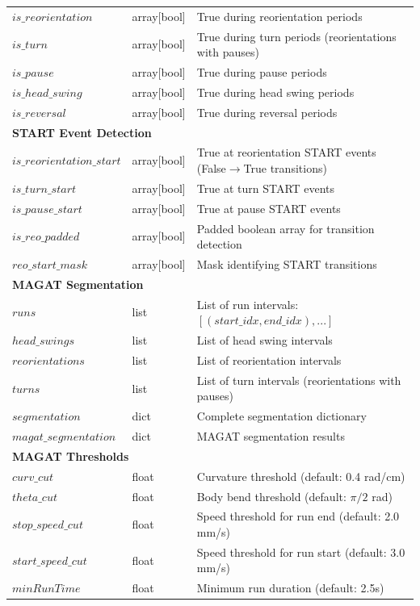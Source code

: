 \documentclass[
  11pt,
]{article}
\begin{document}
\begin{table}[H]
\begin{tabular}{p{3cm}p{2cm}p{9cm}}
$is\_reorientation$ & array[bool] & True during reorientation periods \\
$is\_turn$ & array[bool] & True during turn periods (reorientations with pauses) \\
$is\_pause$ & array[bool] & True during pause periods \\
$is\_head\_swing$ & array[bool] & True during head swing periods \\
$is\_reversal$ & array[bool] & True during reversal periods \\
\hline
\multicolumn{3}{l}{\textbf{START Event Detection}} \\
\hline
$is\_reorientation\_start$ & array[bool] & True at reorientation START events (False$\rightarrow$True transitions) \\
$is\_turn\_start$ & array[bool] & True at turn START events \\
$is\_pause\_start$ & array[bool] & True at pause START events \\
$is\_reo\_padded$ & array[bool] & Padded boolean array for transition detection \\
$reo\_start\_mask$ & array[bool] & Mask identifying START transitions \\
\hline
\multicolumn{3}{l}{\textbf{MAGAT Segmentation}} \\
\hline
$runs$ & list & List of run intervals: $[(start\_idx, end\_idx), ...]$ \\
$head\_swings$ & list & List of head swing intervals \\
$reorientations$ & list & List of reorientation intervals \\
$turns$ & list & List of turn intervals (reorientations with pauses) \\
$segmentation$ & dict & Complete segmentation dictionary \\
$magat\_segmentation$ & dict & MAGAT segmentation results \\
\hline
\multicolumn{3}{l}{\textbf{MAGAT Thresholds}} \\
\hline
$curv\_cut$ & float & Curvature threshold (default: 0.4 rad/cm) \\
$theta\_cut$ & float & Body bend threshold (default: $\pi/2$ rad) \\
$stop\_speed\_cut$ & float & Speed threshold for run end (default: 2.0 mm/s) \\
$start\_speed\_cut$ & float & Speed threshold for run start (default: 3.0 mm/s) \\
$minRunTime$ & float & Minimum run duration (default: 2.5s) \\

\end{tabular}
\end{table}
\end{document}
